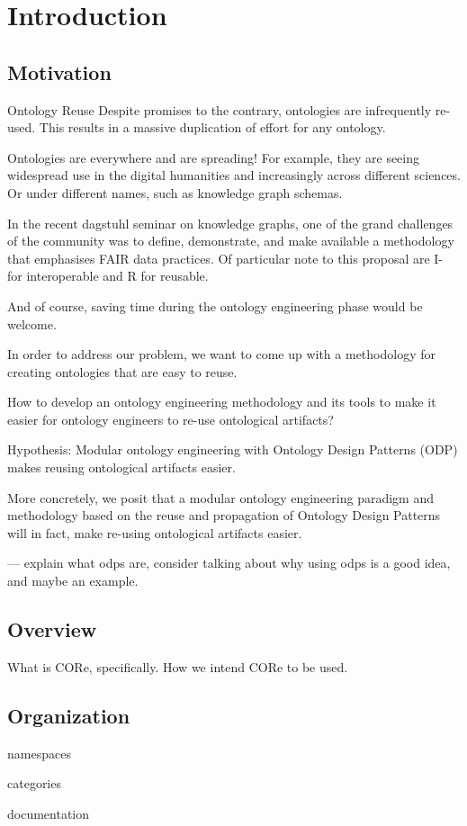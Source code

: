 \chapter{Introduction}

\section{Motivation}
Ontology Reuse
Despite promises to the contrary, ontologies are infrequently re-used. This results in a massive duplication of effort for any ontology.

Ontologies are everywhere and are spreading! For example, they are seeing widespread use in the digital humanities and increasingly across different sciences. Or under different names, such as knowledge graph schemas.

In the recent dagstuhl seminar on knowledge graphs, one of the grand challenges of the community was to define, demonstrate, and make available a methodology that emphasises FAIR data practices. Of particular note to this proposal are I- for interoperable and R for reusable. 

And of course, saving time during the ontology engineering phase would be welcome.

In order to address our problem, we want to come up with a methodology for creating ontologies that are easy to reuse. 

How to develop an ontology engineering methodology and its tools to make it easier for ontology engineers to re-use ontological artifacts?

Hypothesis: Modular ontology engineering with Ontology Design Patterns (ODP) makes reusing ontological artifacts easier.

More concretely, we posit that a modular ontology engineering paradigm and methodology based on the reuse and propagation of Ontology Design Patterns will in fact, make re-using ontological artifacts easier.

--- 
explain what odps are, consider talking about why using odps is a good idea, and maybe an example.

\section{Overview}
What is CORe, specifically.
How we intend CORe to be used.

\section{Organization}
namespaces

categories

documentation